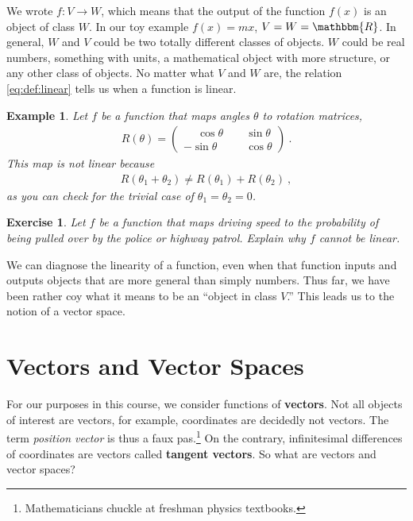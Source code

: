 \documentclass[
  11pt,
	colorful,
	raggedright,
]{tufte-style-thesis-flip}
\newtheorem{exercise}{Exercise}[section]
\newtheorem{example}{Example}[section]
\begin{document}
We wrote $f:V\to W$, which means that the output of the function $f(x)$ is an object of class $W$. In our toy example $f(x)=mx$, $V=W=\mathbbm{R}$. In general, $W$ and $V$ could be two totally different classes of objects. $W$ could be real numbers, something with units, a mathematical object with more structure, or any other class of objects. No matter what $V$ and $W$ are, the relation \eqref{eq:def:linear} tells us when a function is linear. 

\begin{example}
Let $f$ be a function that maps angles $\theta$ to rotation matrices,
\begin{align}
  R(\theta) = 
  \begin{pmatrix}
    \phantom{+}\cos\theta & \phantom{+}\sin\theta \\
    -\sin\theta & \phantom{+}\cos\theta
  \end{pmatrix} \ .
\end{align}
This map is not linear because
\begin{align}
  R(\theta_1 + \theta_2) \neq R(\theta_1) + R(\theta_2) \ ,
\end{align}
as you can check for the trivial case of $\theta_1 = \theta_2 = 0$.
\end{example}
\begin{exercise}
Let $f$ be a function that maps driving speed to the probability of being pulled over by the police or highway patrol. Explain why $f$ cannot be linear.
\end{exercise}

We can diagnose the linearity of a function, even when that function inputs and outputs objects that are more general than simply numbers. Thus far, we have been rather coy what it means to be an ``object in class $V$.'' This leads us to the notion of a vector space. 

\section{Vectors and Vector Spaces}

For our purposes in this course, we consider functions of \textbf{vectors}. Not all objects of interest are vectors, for example, coordinates are decidedly not vectors. The term \emph{position vector} is thus a faux pas.\footnote{Mathematicians chuckle at freshman physics textbooks.} On the contrary, infinitesimal differences of coordinates are vectors called \textbf{tangent vectors}. So what are vectors and vector spaces?
\end{document}
